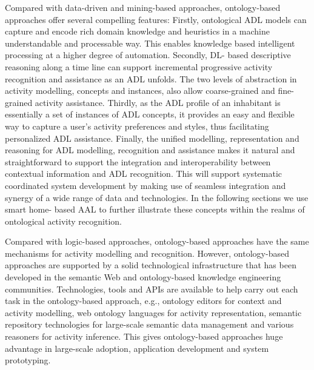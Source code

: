 Compared with data-driven and mining-based approaches, ontology-based approaches offer several compelling features: Firstly, ontological ADL models can capture and encode rich domain knowledge and heuristics in a machine understandable and processable way. This enables knowledge based intelligent processing at a higher degree of automation. Secondly, DL- based descriptive reasoning along a time line can support incremental progressive activity recognition and assistance as an ADL unfolds. The two levels of abstraction in activity modelling, concepts and instances, also allow coarse-grained and fine-grained activity assistance. Thirdly, as the ADL profile of an inhabitant is essentially a set of instances of ADL concepts, it provides an easy and flexible way to capture a user’s activity preferences and styles, thus facilitating personalized ADL assistance. Finally, the unified modelling, representation and reasoning for ADL modelling, recognition and assistance makes it natural and straightforward to support the integration and interoperability between contextual information and ADL recognition. This will support systematic coordinated system development by making use of seamless integration and synergy of a wide range of data and technologies. In the following sections we use smart home- based AAL to further illustrate these concepts within the realms of ontological activity recognition. 

Compared with logic-based approaches, ontology-based approaches have the same mechanisms for activity modelling and recognition. However, ontology-based approaches are supported by a solid technological infrastructure that has been developed in the semantic Web and ontology-based knowledge engineering communities. Technologies, tools and APIs are available to help carry out each task in the ontology-based approach, e.g., ontology editors for context and activity modelling, web ontology languages for activity representation, semantic repository technologies for large-scale semantic data management and various reasoners for activity inference. This gives ontology-based approaches huge advantage in large-scale adoption, application development and system prototyping.


\newcommand{\specialcell}[2][c]{%
  \begin{tabular}[#1]{@{}c@{}}#2\end{tabular}}

